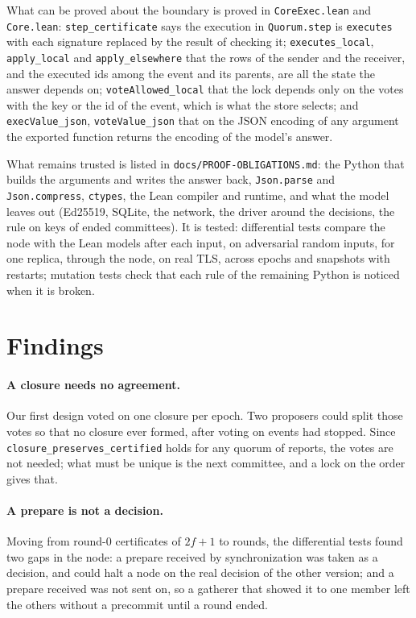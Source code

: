 \documentclass[10pt,a4paper]{article}
\newcommand{\code}[1]{\texttt{#1}}
\begin{document}
What can be proved about the boundary is proved in \code{CoreExec.lean} and \code{Core.lean}:
\code{step\_certificate} says the execution in \code{Quorum.step} is \code{executes} with each signature
replaced by the result of checking it; \code{executes\_local}, \code{apply\_local} and
\code{apply\_elsewhere} that the rows of the sender and the receiver, and the executed ids among the event
and its parents, are all the state the answer depends on; \code{voteAllowed\_local} that the lock depends
only on the votes with the key or the id of the event, which is what the store selects; and
\code{execValue\_json}, \code{voteValue\_json} that on the JSON encoding of any argument the exported
function returns the encoding of the model's answer.

What remains trusted is listed in \code{docs/PROOF-OBLIGATIONS.md}: the Python that builds the
arguments and writes the answer back, \code{Json.parse} and \code{Json.compress}, \code{ctypes}, the Lean
compiler and runtime, and what the model leaves out (Ed25519, SQLite, the network, the driver around the
decisions, the rule on keys of ended committees). It is tested: differential tests compare the node with
the Lean models after each input, on adversarial random inputs, for one replica, through the node, on real
TLS, across epochs and snapshots with restarts; mutation tests check that each rule of the remaining Python
is noticed when it is broken.

\section{Findings}

\paragraph{A closure needs no agreement.} Our first design voted on one closure per epoch. Two proposers
could split those votes so that no closure ever formed, after voting on events had stopped. Since
\code{closure\_preserves\_certified} holds for any quorum of reports, the votes are not needed; what must
be unique is the next committee, and a lock on the order gives that.

\paragraph{A prepare is not a decision.} Moving from round-0 certificates of $2f+1$ to rounds, the
differential tests found two gaps in the node: a prepare received by synchronization was taken as a
decision, and could halt a node on the real decision of the other version; and a prepare received was
not sent on, so a gatherer that showed it to one member left the others without a precommit until a
round ended.
\end{document}

